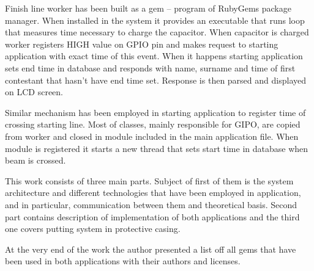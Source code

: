 \documentclass[11pt,a4paper, twoside]{article}
\begin{document}
	Finish line worker has been built as a gem – program of RubyGems package manager. When installed in the system it provides an executable that runs  loop that measures time necessary to charge the capacitor. When capacitor is charged worker registers HIGH value on GPIO pin and makes request to starting application with exact time of this event. When it happens starting application sets end time in database and responds with name, surname and time of first contestant that hasn't have end time set. Response is then parsed and displayed on  LCD  screen.
	
	Similar mechanism has been employed in starting application to register time of crossing starting line. Most of classes, mainly responsible for GIPO, are copied from worker and closed in module included in the main application file. When module is registered it starts a new thread that sets start time in database when beam  is crossed.
	
	This work consists of three main parts. Subject of first of them is the system architecture and different technologies that have been employed in application, and in particular, communication between them and theoretical basis. Second part contains description of implementation of both applications and the third one covers putting system in protective casing.
	
	At the very end of the work the author presented a list off all gems that have been used in both applications with their authors and licenses.
\end{document}
